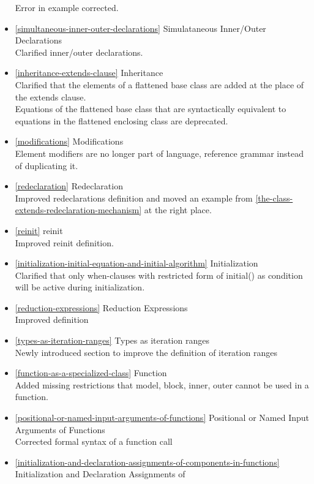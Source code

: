 \documentclass[../MLS.tex]{subfiles}
\begin{document}
\begin{itemize}
  Error in example corrected.
\item
  \autoref{simultaneous-inner-outer-declarations} Simulataneous Inner/Outer Declarations\\
  Clarified inner/outer declarations.
\item
  \autoref{inheritance-extends-clause} Inheritance\\
  Clarified that the elements of a flattened base class are added at the
  place of the extends clause.\\
  Equations of the flattened base class that are syntactically
  equivalent to equations in the flattened enclosing class are
  deprecated.
\item
  \autoref{modifications} Modifications\\
  Element modifiers are no longer part of language, reference grammar
  instead of duplicating it.
\item
  \autoref{redeclaration} Redeclaration\\
  Improved redeclarations definition and moved an example from \autoref{the-class-extends-redeclaration-mechanism} at
  the right place.
\item
  \autoref{reinit} reinit\\
  Improved reinit definition.
\item
  \autoref{initialization-initial-equation-and-initial-algorithm} Initialization\\
  Clarified that only when-clauses with restricted form of initial() as
  condition will be active during initialization.
\item
  \autoref{reduction-expressions} Reduction Expressions\\
  Improved definition
\item
  \autoref{types-as-iteration-ranges} Types as iteration ranges\\
  Newly introduced section to improve the definition of iteration ranges
\item
  \autoref{function-as-a-specialized-class} Function\\
  Added missing restrictions that model, block, inner, outer cannot be
  used in a function.
\item
  \autoref{positional-or-named-input-arguments-of-functions} Positional or Named Input Arguments of Functions\\
  Corrected formal syntax of a function call
\item
  \autoref{initialization-and-declaration-assignments-of-components-in-functions} Initialization and Declaration Assignments of

\end{itemize}
\end{document}
